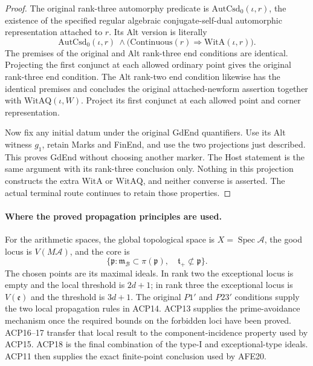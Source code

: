 \begin{proof}
The original rank-three automorphy predicate is
\(\mathrm{AutCsd}_0(\iota,r)\), the existence of the specified
regular algebraic conjugate-self-dual automorphic representation
attached to \(r\).  Its Alt version is literally
\[
 \mathrm{AutCsd}_0(\iota,r)\ \land
             \bigl(\mathrm{Continuous}(r)\Rightarrow
                                      \mathrm{WitA}(\iota,r)\bigr).
                                                        \tag{ACP.28}
\]
The premises of the original and Alt rank-three end conditions
are identical.  Projecting the first conjunct at each allowed
ordinary point gives the original rank-three end condition.
The Alt rank-two end condition likewise has the identical
premises and concludes the original attached-newform assertion
together with \(\mathrm{WitAQ}(\iota,W)\).  Project its first
conjunct at each allowed point and corner representation.

Now fix any initial datum under the original GdEnd quantifiers.
Use its Alt witness \(g_1\), retain Marks and FinEnd, and use
the two projections just described.  This proves GdEnd without
choosing another marker.  The Host statement is the same
argument with its rank-three conclusion only.  Nothing in
this projection constructs the extra \(\mathrm{WitA}\) or
\(\mathrm{WitAQ}\), and neither converse is asserted.
The actual terminal route continues to retain those properties.
\end{proof}

\paragraph{Where the proved propagation principles are used.}
For the arithmetic spaces, the global topological space is
\(X=\operatorname{Spec}\mathcal A\), the good locus is
\(V(M\mathcal A)\), and the core is
\[
 \{\mathfrak p:\mathfrak m_{\mathcal B}
        \subset\pi(\mathfrak p),\quad
                      \mathfrak t_+\not\subset\mathfrak p\}.
                                                        \tag{ACP.29}
\]
The chosen points are its maximal ideals.  In rank two the
exceptional locus is empty and the local threshold is
\(2d+1\); in rank three the exceptional locus is
\(V(\mathfrak e)\) and the threshold is \(3d+1\).
The original \(P1'\) and \(P23'\) conditions supply the
two local propagation rules in ACP14.  ACP13 supplies the
prime-avoidance mechanism once the required bounds on the
forbidden loci have been proved.  ACP16--17 transfer that
local result to the component-incidence property used by
ACP15.  ACP18 is the final combination of the type-I and
exceptional-type ideals.  ACP11 then supplies the exact
finite-point conclusion used by AFE20.

